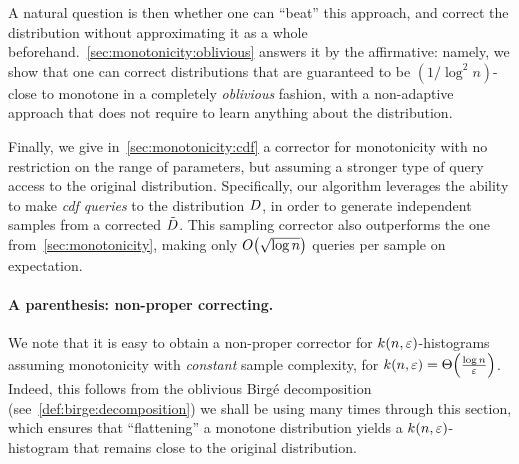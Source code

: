 A natural question is then whether one can ``beat'' this approach, and correct the distribution without approximating it as a whole beforehand.~\autoref{sec:monotonicity:oblivious} answers it by the affirmative: namely, we show that one can correct distributions that are guaranteed to be $(1/\log^2 n)$-close to monotone in a completely \emph{oblivious} fashion, with a non-adaptive approach that does not require to learn anything about the distribution.

Finally, we give in~\autoref{sec:monotonicity:cdf} a corrector for monotonicity with no restriction on the range of parameters, but assuming a stronger type of query access to the original distribution. {Specifically}, our algorithm leverages the ability to make \emph{cdf queries} to the distribution $D$, in order to generate independent samples from a corrected $\tilde{D}$. This sampling corrector also outperforms the one from~\autoref{sec:monotonicity}, making only $\bigO{\sqrt{\log n}}$ queries per sample on expectation.

{\paragraph{A parenthesis: non-proper correcting.} We note that it is easy to obtain a non-proper corrector for $k(n,\varepsilon)$-histograms assuming monotonicity with \emph{constant} sample complexity, for $k(n,\eps) = \bigTheta{\frac{\log n}{\eps}}$. Indeed, this follows from the oblivious Birg\'e decomposition {(see~\autoref{def:birge:decomposition})} we shall be using many times through this section, which ensures that ``flattening'' a monotone distribution yields a $k(n,\varepsilon)$-histogram that remains close to the original distribution.}

